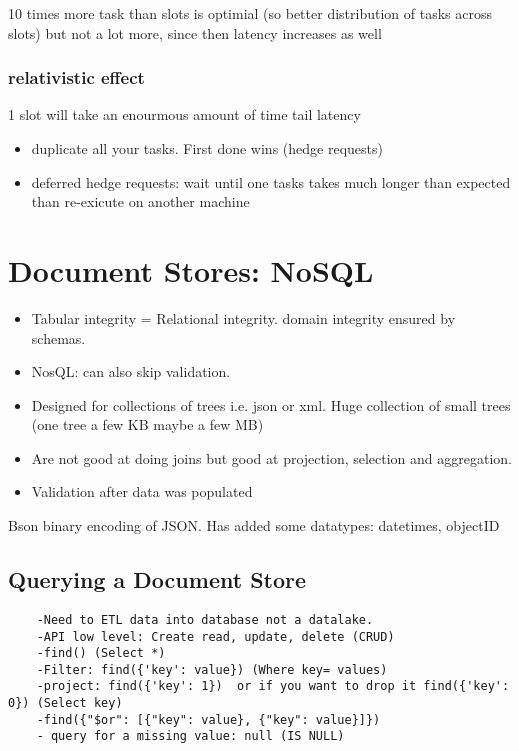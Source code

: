 10 times more task than slots is optimial (so better distribution of tasks across slots) but not a lot more, since then latency increases as well

\subsubsection{relativistic effect}
1 slot will take an enourmous amount of time \textrightarrow tail latency
\begin{itemize}
    \item duplicate all your tasks. First done wins (hedge requests)
    \item deferred hedge requests: wait until one tasks takes much longer than expected than re-exicute on another machine
\end{itemize}



\section{Document Stores: NoSQL}
\begin{itemize}
    \item Tabular integrity = Relational integrity. domain integrity ensured by schemas.
    \item NosQL: can also  skip validation.
    \item Designed for collections of trees i.e. json or xml. Huge collection of small trees (one tree a few KB maybe a few MB)
    \item Are not good at doing joins but good at projection, selection and aggregation.
    \item Validation after data was populated
\end{itemize}

Bson binary encoding of JSON. Has added some datatypes: datetimes, objectID

\subsection{Querying a Document Store}


\begin{lstlisting}
    -Need to ETL data into database not a datalake.
    -API low level: Create read, update, delete (CRUD)
    -find() (Select *)
    -Filter: find({'key': value}) (Where key= values)
    -project: find({'key': 1})  or if you want to drop it find({'key': 0}) (Select key)
    -find({"$or": [{"key": value}, {"key": value}]})
    - query for a missing value: null (IS NULL)
\end{lstlisting}









